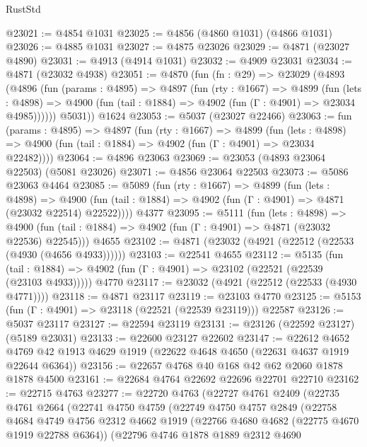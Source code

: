 \begin{lexlean}{RustStd}
\begin{coremodule}
{\begin{coremodule}
{{{{{{{{{{{{{{{{{{{{{{{{{{{{{@23021 := @4854 @1031
@23025 := @4856 (@4860 @1031) (@4866 @1031)
@23026 := @4885 @1031
@23027 := @4875 @23026
@23029 := @4871 (@23027 @4890)
@23031 := @4913 (@4914 @1031)
@23032 := @4909 @23031
@23034 := @4871 (@23032 @4938)
@23051 := @4870
    (fun (fn : @29) =>
    @23029
      (@4893
        (@4896
          (fun (params : @4895) =>
          @4897
            (fun (rty : @1667) =>
            @4899
              (fun (lets : @4898) =>
              @4900 (fun (tail : @1884) => @4902 (fun (Γ : @4901) => @23034 @4985))))))
        @5031))
    @1624
@23053 := @5037 (@23027 @22466)
@23063 := fun (params : @4895) =>
  @4897
    (fun (rty : @1667) =>
    @4899
      (fun (lets : @4898) =>
      @4900 (fun (tail : @1884) => @4902 (fun (Γ : @4901) => @23034 @22482))))
@23064 := @4896 @23063
@23069 := @23053 (@4893 @23064 @22503) (@5081 @23026)
@23071 := @4856 @23064 @22503
@23073 := @5086 @23063 @4464
@23085 := @5089
    (fun (rty : @1667) =>
    @4899
      (fun (lets : @4898) =>
      @4900 (fun (tail : @1884) => @4902 (fun (Γ : @4901) => @4871 (@23032 @22514) @22522))))
    @4377
@23095 := @5111
    (fun (lets : @4898) =>
    @4900 (fun (tail : @1884) => @4902 (fun (Γ : @4901) => @4871 (@23032 @22536) @22545)))
    @4655
@23102 := @4871 (@23032 (@4921 (@22512 (@22533 (@4930 (@4656 @4933))))))
@23103 := @22541 @4655
@23112 := @5135
    (fun (tail : @1884) => @4902 (fun (Γ : @4901) => @23102 (@22521 (@22539 (@23103 @4933)))))
    @4770
@23117 := @23032 (@4921 (@22512 (@22533 (@4930 @4771))))
@23118 := @4871 @23117
@23119 := @23103 @4770
@23125 := @5153 (fun (Γ : @4901) => @23118 (@22521 (@22539 @23119))) @22587
@23126 := @5037 @23117
@23127 := @22594 @23119
@23131 := @23126 (@22592 @23127) (@5189 @23031)
@23133 := @22600 @23127 @22602
@23147 := @22612
    @4652
    @4769
    @42
    @1913
    @4629
    @1919
    (@22622 @4648 @4650 (@22631 @4637 @1919 @22644 @6364))
@23156 := @22657 @4768 @40 @168 @42 @62 @2060 @1878 @1878 @4500
@23161 := @22684 @4764 @22692 @22696 @22701 @22710
@23162 := @22715 @4763
@23277 := @22720
    @4763
    (@22727
      @4761
      @2409
      (@22735
        @4761
        @2664
        (@22741
          @4750
          @4759
          (@22749
            @4750
            @4757
            @2849
            (@22758
              @4684
              @4749
              @4756
              @2312
              @4662
              @1919
              (@22766 @4680 @4682 (@22775 @4670 @1919 @22788 @6364))
              (@22796
                @4746
                @1878
                @1889
                @2312
                @4690
}}}}}}}}}}}}}}}}}}}}}}}}}}}}}
\end{coremodule}}
\end{coremodule}
\end{lexlean}
